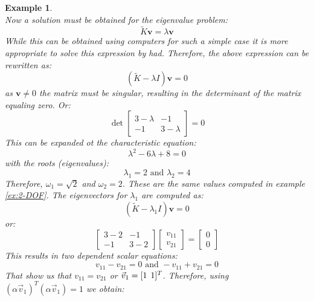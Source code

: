\documentclass[12pt,letter]{article}
\newtheorem{ex}{Example}
\numberwithin{ex}{section} %
\newenvironment{example}{\begin{mdframed}[middlelinewidth=0.5mm]\begin{ex}\normalfont}{\end{ex}\end{mdframed}}
\numberwithin{re}{section} %
\begin{document}
\begin{example}
\begin{equation}
\end{equation}
Now a solution must be obtained for the eigenvalue problem:
\begin{equation}
\widetilde{K}\textbf{v} =  \lambda \textbf{v}
\end{equation}
While this can be obtained using computers for such a simple case it is more appropriate to solve this expression by had. Therefore, the above expression can be rewritten as:
\begin{equation}
(\widetilde{K} - \lambda I)\textbf{v} =  0
\end{equation}
as $\textbf{v} \neq 0$ the matrix must be singular, resulting in the determinant of the matrix equaling zero. Or:
\begin{equation}
\det \begin{bmatrix} 3-\lambda & -1 \\    -1  & 3-\lambda \end{bmatrix}  =  0
\end{equation}
This can be expanded ot the characteristic equation:
\begin{equation}
\lambda^2 -6\lambda + 8  =  0
\end{equation}
with the roots (eigenvalues):
\begin{equation}
\lambda_1 = 2\text{ and } \lambda_2 = 4
\end{equation}
Therefore, $\omega_1=\sqrt{2}$ and $\omega_2=2$. These are the same values computed in example \ref{ex:2-DOF}. The eigenvectors for $\lambda_1$ are computed as:
\begin{equation}
(\widetilde{K} - \lambda_1 I)\textbf{v} =  0
\end{equation}
or:
\begin{equation}
\begin{bmatrix} 3-2 & -1 \\    -1  & 3-2 \end{bmatrix} \begin{bmatrix} v_{11} \\ v_{21}  \end{bmatrix} =  \begin{bmatrix} 0 \\ 0  \end{bmatrix}
\end{equation}
This results in two dependent scalar equations:
\begin{equation}
v_{11} - v_{21} = 0 \text{ and } -v_{11} + v_{21} =0
\end{equation}
That show us that $v_{11} = v_{21}$ or $\vec{v}_1=[1 \hspace{1ex} 1]^T$. Therefore, using $(\alpha \vec{v}_1)^T(\alpha \vec{v}_1) = 1$ we obtain:

\end{example}
\end{document}
